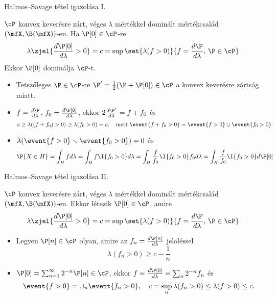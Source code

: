 \documentclass[aspectratio=169,notheorems,9pt,\option]{beamer}
\begin{document}
\begin{frame}{Halmos--Savage tétel igazolása I.}
\begin{lemma}
  $\cP$ konvex keverésre zárt, véges $\lambda$ mértékkel dominált mértékcsalád 
  $(\mfX,\B(\mfX))$-en. Ha $\P[0]\in\cP$-re
  \begin{displaymath}
    \lambda\zjel{\frac{d\P[0]}{d\lambda}>0}=c=\sup\set{\lambda(f>0)}{f=\frac{d\P}{d\lambda},\,\P\in\cP}
  \end{displaymath}
  Ekkor $\P[0]$ dominálja $\cP$-t.
\end{lemma}
\begin{itemize}
  \item Tetszőleges $\P\in\cP$-re $\P'=\frac12(\P+\P[0])\in\cP$ a konvex keverésre zártság miatt.
  \item $f=\frac{d\P}{d\lambda}$, $f_0=\frac{d\P[0]}{d\lambda}$, 
  ekkor $2\frac{d\P'}{d\lambda}=f+f_0$ és 
  \begin{displaymath}
    c\geq \lambda((f+f_0)>0)\geq \lambda(f_0>0)=c, 
    \quad\text{mert $\event{f+f_0>0}=\event{f>0}\cup\event{f_0>0}$}.
  \end{displaymath}
  \item $\lambda(\event{f>0}\setminus\event{f_0>0})=0$ és 
  \begin{displaymath}
    \P{X\in H}
    =\int_H f d\lambda
    =\int_H f\I{f_0>0}d\lambda
    =\int_H \frac{f}{f_0}\I{f_0>0}f_0d\lambda
    =\int_H \frac{f}{f_0}\I{f_0>0}d\P[0]
  \end{displaymath} 
\end{itemize}
\end{frame}

\begin{frame}{Halmos--Savage tétel igazolása II.}
\begin{lemma}
  $\cP$ konvex keverésre zárt, véges $\lambda$ mértékkel dominált mértékcsalád 
  $(\mfX,\B(\mfX))$-en. Ekkor létezik $\P[0]\in\cP$, amire
  \begin{displaymath}
    \lambda\zjel{\frac{d\P[0]}{d\lambda}>0}=c=\sup\set{\lambda(f>0)}{f=\frac{d\P}{d\lambda},\,\P\in\cP}
  \end{displaymath}
\end{lemma}
\begin{itemize}
  \item Legyen $\P[n]\in\cP$ olyan, amire az $f_n=\frac{d\P[n]}{d\lambda}$ jelöléssel
  \begin{displaymath}
    \lambda(f_n>0)\geq c-\frac1n
  \end{displaymath}
  \item $\P[0]=\sum_{n=1}^{\infty} 2^{-n} \P[n]\in\cP$, ekkor 
  $f=\frac{d\P[0]}{d\lambda}=\sum_n 2^{-n}f_n$ és 
  \begin{displaymath}
    \event{f>0}=\cup_n\event{f_n>0},\quad c = \sup_n\lambda(f_n>0)\leq \lambda(f>0)\leq c.
  \end{displaymath}
\end{itemize}
\end{frame}
\end{document}
